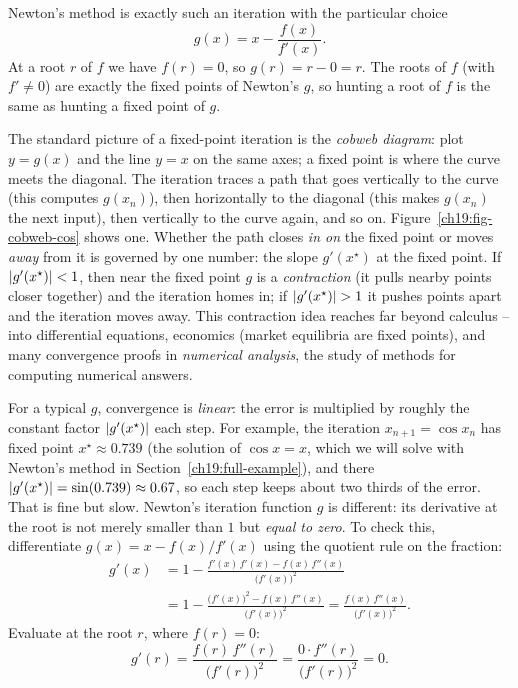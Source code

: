 Newton's method is exactly such an iteration with the particular choice
\[
  g(x) = x - \frac{f(x)}{f'(x)}.
\]
At a root $r$ of $f$ we have $f(r) = 0$, so $g(r) = r - 0 = r$. The
roots of $f$ (with $f' \ne 0$) are exactly the fixed points of Newton's $g$, so
hunting a root of $f$ is the same as hunting a fixed point of $g$.

\begin{connectionbox}
The standard picture of a fixed-point iteration is the \emph{cobweb diagram}: plot
$y = g(x)$ and the line $y = x$ on the same axes; a fixed point is where the curve
meets the diagonal. The iteration traces a path that goes vertically to the curve
(this computes $g(x_n)$), then horizontally to the diagonal (this makes $g(x_n)$ the
next input), then vertically to the curve again, and so on.
Figure~\ref{ch19:fig-cobweb-cos} shows one. Whether the path closes \emph{in on}
the fixed point or moves \emph{away} from it is governed by one number: the slope
$g'(x^\star)$ at the fixed point. If $\lvert g'(x^\star)\rvert < 1$, then near the fixed
point $g$ is a \emph{contraction} (it pulls nearby points closer together) and the
iteration homes in; if $\lvert g'(x^\star)\rvert > 1$ it pushes points apart and the
iteration moves away. This contraction idea reaches far beyond calculus -- into
differential equations, economics (market equilibria are fixed points), and many
convergence proofs in \emph{numerical analysis}, the study of methods for
computing numerical answers.
\end{connectionbox}

For a typical $g$, convergence is \emph{linear}: the error is multiplied by
roughly the constant factor $\lvert g'(x^\star)\rvert$ each step. For example, the
iteration $x_{n+1} = \cos x_n$ has fixed point $x^\star \approx 0.739$ (the solution
of $\cos x = x$, which we will solve with Newton's method in
Section~\ref{ch19:full-example}), and there
$\lvert g'(x^\star)\rvert = \sin(0.739) \approx 0.67$, so each step keeps about two thirds
of the error. That is fine but slow. Newton's iteration function $g$ is different:
its derivative at the root is not merely smaller than $1$ but
\emph{equal to zero}. To check this, differentiate
$g(x) = x - f(x)/f'(x)$ using the quotient rule on the fraction:
\begin{align*}
  g'(x) &= 1 - \frac{f'(x)\,f'(x) - f(x)\,f''(x)}{\bigl(f'(x)\bigr)^2}\\
        &= 1 - \frac{\bigl(f'(x)\bigr)^2 - f(x)\,f''(x)}{\bigl(f'(x)\bigr)^2}
         = \frac{f(x)\,f''(x)}{\bigl(f'(x)\bigr)^2}.
\end{align*}
Evaluate at the root $r$, where $f(r) = 0$:
\[
  g'(r) = \frac{f(r)\,f''(r)}{\bigl(f'(r)\bigr)^2} = \frac{0 \cdot f''(r)}{\bigl(f'(r)\bigr)^2} = 0.
\]

